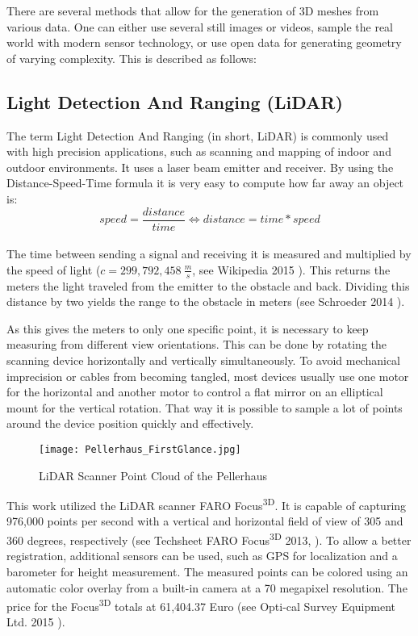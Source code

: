 There are several methods that allow for the generation of 3D meshes from various data. One can either use several still images or videos, sample the real world with modern sensor technology, or use open data for generating geometry of varying complexity. This is described as follows:

\subsection{Light Detection And Ranging (LiDAR)}

The term Light Detection And Ranging (in short, LiDAR) is commonly used with high precision applications, such as scanning and mapping of indoor and outdoor environments. It uses a laser beam emitter and receiver. By using the Distance-Speed-Time formula it is very easy to compute how far away an object is:\\

$$  speed = \dfrac{distance}{time} \Longleftrightarrow distance = time * speed $$\\
The time between sending a signal and receiving it is measured and multiplied by the speed of light ($c = 299,792,458 \medspace \frac{m}{s}$, see Wikipedia 2015 \parencite{wiki:SpeedOfLight}). This returns the meters the light traveled from the emitter to the obstacle and back. Dividing this distance by two yields the range to the obstacle in meters (see Schroeder 2014 \parencite{dp_lidar}).

As this gives the meters to only one specific point, it is necessary to keep measuring from different view orientations. This can be done by rotating the scanning device horizontally and vertically simultaneously. To avoid mechanical imprecision or cables from becoming tangled, most devices usually use one motor for the horizontal and another motor to control a flat mirror on an elliptical mount for the vertical rotation. That way it is possible to sample a lot of points around the device position quickly and effectively.

\begin{figure}[h]
	\centering
	\texttt{[image: Pellerhaus\_FirstGlance.jpg]}
	\caption{LiDAR Scanner Point Cloud of the Pellerhaus}
	\label{fig:LiDAR_PointCloud}
\end{figure}

This work utilized the LiDAR scanner FARO Focus\textsuperscript{3D}. It is capable of capturing 976,000 points per second with a vertical and horizontal field of view of 305 and 360 degrees, respectively (see Techsheet FARO Focus\textsuperscript{3D} 2013, \parencite{faro_techsheet}). To allow a better registration, additional sensors can be used, such as GPS for localization and a barometer for height measurement. The measured points can be colored using an automatic color overlay from a built-in camera at a 70 megapixel resolution. The price for the Focus\textsuperscript{3D} totals at 61,404.37 Euro (see Opti-cal Survey Equipment Ltd. 2015 \parencite{survey_equipment}).

